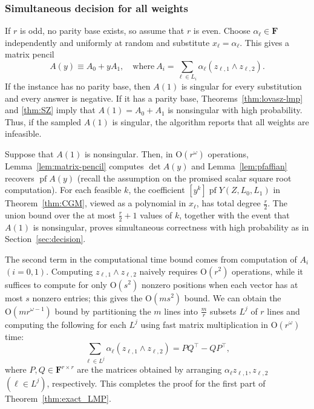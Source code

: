 \documentclass[11pt, a4paper]{article}
\theoremstyle{plain}
\theoremstyle{definition}
\theoremstyle{remark}
\newcommand{\bF}{\mathbf{F}}
\DeclareMathOperator{\pf}{pf}
\begin{document}
\subsubsection{Simultaneous decision for all weights}
If $r$ is odd, no parity base exists, so assume that $r$ is even.
Choose $\alpha_\ell\in\bF$ independently and uniformly at random and substitute $x_\ell=\alpha_\ell$.
This gives a matrix pencil
\[A(y)\equiv A_0+yA_1, \quad\text{where}~A_i = \sum_{\ell\in L_i}\alpha_\ell(z_{\ell,1}\wedge z_{\ell,2}).\]
If the instance has no parity base, then $A(1)$ is singular for every substitution and every answer is negative.
If it has a parity base, Theorems~\ref{thm:lovasz-lmp} and \ref{thm:SZ} imply that $A(1)=A_0+A_1$ is nonsingular with high probability.
Thus, if the sampled $A(1)$ is singular, the algorithm reports that all weights are infeasible.

Suppose that $A(1)$ is nonsingular.
Then,  in $\mathrm{O}(r^\omega)$ operations, Lemma~\ref{lem:matrix-pencil} computes $\det A(y)$ and Lemma~\ref{lem:pfaffian} recovers $\pf A(y)$ (recall the assumption on the promised scalar square root computation).
For each feasible $k$, the coefficient $[y^k]\pf Y(Z, L_0, L_1)$ in Theorem~\ref{thm:CGM}, viewed as a polynomial in $x_\ell$, has total degree $\frac{r}{2}$.
The union bound over the at most $\frac{r}{2}+1$ values of $k$, together with the event that $A(1)$ is nonsingular, proves simultaneous correctness with high probability as in Section~\ref{sec:decision}.

The second term in the computational time bound comes from computation of $A_i$ $(i = 0, 1)$.
Computing $z_{\ell,1} \wedge z_{\ell,2}$ naively requires $\mathrm{O}(r^2)$ operations, while it suffices to compute for only $\mathrm{O}(s^2)$ nonzero positions when each vector has at most $s$ nonzero entries; this gives the $\mathrm{O}(ms^2)$ bound.
We can obtain the $\mathrm{O}(mr^{\omega - 1})$ bound by partitioning the $m$ lines into $\frac{m}{r}$ subsets $L^j$ of $r$ lines and computing the following for each $L^j$ using fast matrix multiplication in $\mathrm{O}(r^\omega)$ time:
\[\sum_{\ell \in L^j}\alpha_\ell (z_{\ell,1} \wedge z_{\ell,2}) = PQ^\top - QP^\top,\]
where $P, Q \in \bF^{r \times r}$ are the matrices obtained by arranging $\alpha_\ell z_{\ell, 1}, z_{\ell, 2}$ $(\ell \in L^j)$, respectively.
This completes the proof for the first part of Theorem~\ref{thm:exact_LMP}.
\end{document}
